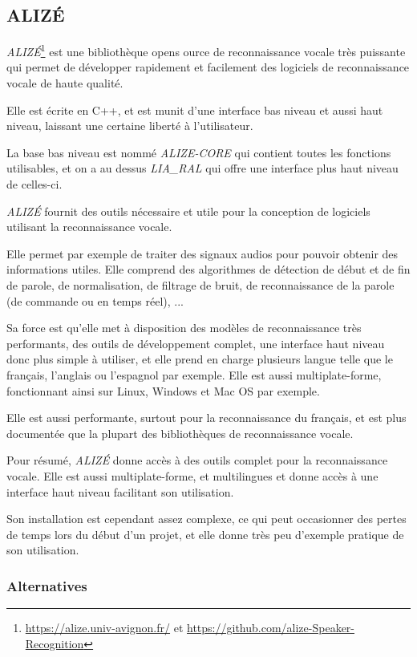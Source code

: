 
\subsection{ALIZÉ}
\label{subsec:ALIZE}

\textit{ALIZÉ}\footnote{\url{https://alize.univ-avignon.fr/} et \url{https://github.com/alize-Speaker-Recognition}} est une bibliothèque opens ource de reconnaissance vocale très puissante qui permet de développer rapidement et facilement des logiciels de reconnaissance
vocale de haute qualité.

Elle est écrite en C++, et est munit d'une interface bas niveau et aussi haut niveau, laissant une certaine liberté à l'utilisateur.

La base bas niveau est nommé \textit{ALIZE-CORE} qui contient toutes les fonctions utilisables, et on a au dessus \textit{LIA\_RAL} qui offre une interface plus haut niveau de celles-ci.

\textit{ALIZÉ} fournit des outils nécessaire et utile pour la conception de logiciels utilisant la reconnaissance vocale.

Elle permet par exemple de traiter des signaux audios pour pouvoir obtenir des informations utiles. Elle comprend des algorithmes de détection de début et de fin de parole, de normalisation,
de filtrage de bruit, de reconnaissance de la parole (de commande ou en temps réel), ...

Sa force est qu'elle met à disposition des modèles de reconnaissance très performants, des outils de développement complet, une interface haut niveau donc plus simple à utiliser, et
elle prend en charge plusieurs langue telle que le français, l'anglais ou l'espagnol par exemple. Elle est aussi multiplate-forme, fonctionnant ainsi sur Linux, Windows et Mac OS par exemple.

Elle est aussi performante, surtout pour la reconnaissance du français, et est plus documentée que la plupart des bibliothèques de reconnaissance vocale.

Pour résumé, \textit{ALIZÉ} donne accès à des outils complet pour la reconnaissance vocale. Elle est aussi multiplate-forme, et multilingues et donne accès
à une interface haut niveau facilitant son utilisation.

Son installation est cependant assez complexe, ce qui peut occasionner des pertes de temps lors du début d'un projet, et elle donne très peu d'exemple pratique de son utilisation.


\subsubsection*{Alternatives}

